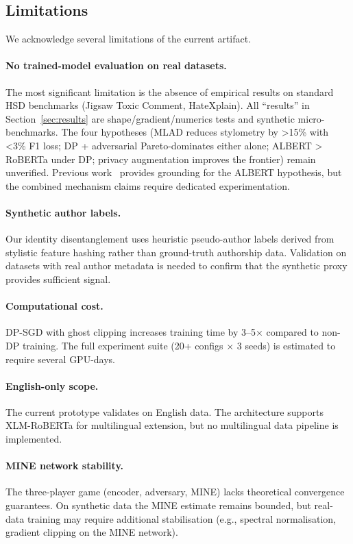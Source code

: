 \documentclass{article}
\begin{document}
\subsection{Limitations}
\label{sec:limitations}

We acknowledge several limitations of the current artifact.

\paragraph{No trained-model evaluation on real datasets.}
The most significant limitation is the absence of empirical results on
standard HSD benchmarks (Jigsaw Toxic Comment, HateXplain). All
``results'' in Section~\ref{sec:results} are shape/gradient/numerics
tests and synthetic micro-benchmarks. The four hypotheses
(MLAD reduces stylometry by >15\% with <3\% F1 loss; DP + adversarial
Pareto-dominates either alone; ALBERT > RoBERTa under DP; privacy
augmentation improves the frontier) remain unverified.
Previous work~\cite{bueno2025privacy} provides grounding for the ALBERT
hypothesis, but the combined mechanism claims require dedicated
experimentation.

\paragraph{Synthetic author labels.}
Our identity disentanglement uses heuristic pseudo-author labels derived
from stylistic feature hashing rather than ground-truth authorship data.
Validation on datasets with real author metadata is needed to confirm
that the synthetic proxy provides sufficient signal.

\paragraph{Computational cost.}
DP-SGD with ghost clipping increases training time by 3--5$\times$
compared to non-DP training. The full experiment suite (20+ configs
$\times$ 3 seeds) is estimated to require several GPU-days.

\paragraph{English-only scope.}
The current prototype validates on English data. The architecture
supports XLM-RoBERTa for multilingual extension, but no multilingual
data pipeline is implemented.

\paragraph{MINE network stability.}
The three-player game (encoder, adversary, MINE) lacks theoretical
convergence guarantees. On synthetic data the MINE estimate remains
bounded, but real-data training may require additional stabilisation
(e.g., spectral normalisation, gradient clipping on the MINE network).
\end{document}
